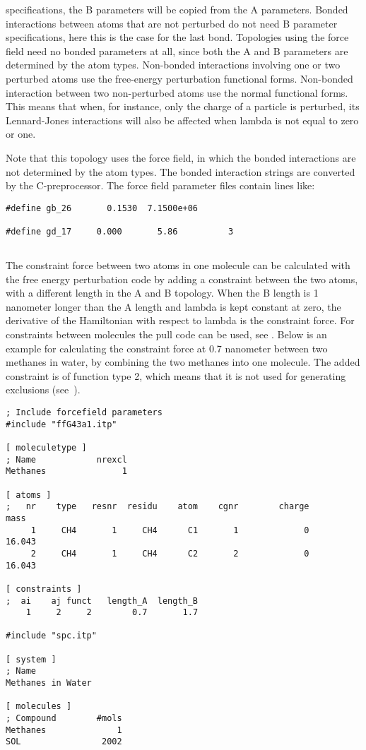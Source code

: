 specifications, the B parameters will be copied from the A parameters.
Bonded interactions between atoms that are not perturbed do not need B
parameter specifications, here this is the case for the last bond.
Topologies using the {\gromacs} force field need no bonded parameters at all,
since both the A and B parameters are determined by the atom types.
Non-bonded interactions involving one or two perturbed atoms use the 
free-energy perturbation functional forms.
Non-bonded interaction between two non-perturbed atoms use the normal
functional forms.
This means that when, for instance, only the charge of a particle is
perturbed, its Lennard-Jones interactions will also be affected when
lambda is not equal to zero or one.

Note that this topology uses the  force field, in which the bonded
interactions are not determined by the atom types. The bonded interaction
strings are converted by the C-preprocessor. The force field parameter
files contain lines like:
{\small\begin{verbatim}
#define gb_26       0.1530  7.1500e+06

#define gd_17     0.000       5.86          3
\end{verbatim}}

\subsection{}
The constraint force between two atoms in one molecule can be calculated
with the free energy perturbation code by adding a constraint between the
two atoms, with a different length in the A and B topology. When the B length
is 1 nanometer longer than the A length and lambda is kept constant at zero,
the derivative of the Hamiltonian with respect to lambda is the constraint
force. For constraints between molecules the pull code can be used,
see .
Below is an example for calculating the constraint force at 0.7 nanometer
between two methanes in water, by combining the two methanes into one molecule.
The added constraint is of function type 2, which means that it is not
used for generating exclusions (see~).
{\small\begin{verbatim}
; Include forcefield parameters
#include "ffG43a1.itp"

[ moleculetype ]
; Name            nrexcl
Methanes               1

[ atoms ]
;   nr    type   resnr  residu    atom    cgnr        charge          mass
     1     CH4       1     CH4      C1       1             0        16.043
     2     CH4       1     CH4      C2       2             0        16.043

[ constraints ]
;  ai    aj funct   length_A  length_B
    1     2     2        0.7       1.7

#include "spc.itp"

[ system ]
; Name
Methanes in Water

[ molecules ]
; Compound        #mols
Methanes              1
SOL                2002
\end{verbatim}}

